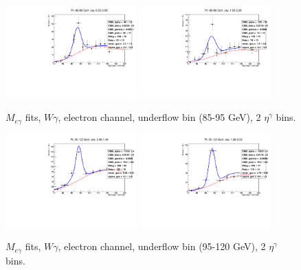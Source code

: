 \begin{figure}[htb]
  \begin{center}
   \includegraphics[width=0.45\textwidth]{../figs/figs_v11/ELECTRON_WGamma/EtoGammaFits/sa_hZmass_h_Data_EtoGamma_Enr_BARREL_pt85to95_ieta0_noWMtCut.pdf}
   \includegraphics[width=0.45\textwidth]{../figs/figs_v11/ELECTRON_WGamma/EtoGammaFits/sa_hZmass_h_Data_EtoGamma_Enr_ENDCAP_pt85to95_ieta0_noWMtCut.pdf}\\
  \label{fig:etogFits_85to95}
  \caption{$M_{e\gamma}$ fits, $W\gamma$, electron channel, underflow bin (85-95 GeV), 2 $\eta^{\gamma}$ bins.}
  \end{center}
\end{figure}

\begin{figure}[htb]
  \begin{center}
   \includegraphics[width=0.45\textwidth]{../figs/figs_v11/ELECTRON_WGamma/EtoGammaFits/sa_hZmass_h_Data_EtoGamma_Enr_BARREL_pt95to120_ieta0_noWMtCut.pdf}
   \includegraphics[width=0.45\textwidth]{../figs/figs_v11/ELECTRON_WGamma/EtoGammaFits/sa_hZmass_h_Data_EtoGamma_Enr_ENDCAP_pt95to120_ieta0_noWMtCut.pdf}\\
  \label{fig:etogFits_95to120}
  \caption{$M_{e\gamma}$ fits, $W\gamma$, electron channel, underflow bin (95-120 GeV), 2 $\eta^{\gamma}$ bins.}
  \end{center}
\end{figure}

